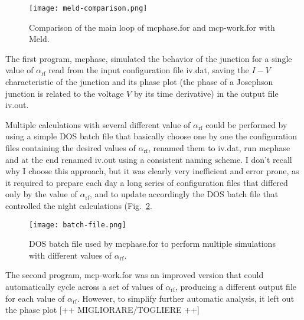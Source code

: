 \begin{figure}[bt]
	\centering
	\texttt{[image: meld-comparison.png]}
	\caption{Comparison of the main loop of \textsf{mcphase.for} and \textsf{mcp-work.for} with Meld.}
	\label{fig:meld-comparison}
\end{figure}


The first program, \textsf{mcphase}, simulated the behavior of the junction for a single value of $\alpha_\mathrm{rf}$ read from the input configuration file \textsf{iv.dat}, saving the $I - V$ characteristic of the junction and its phase plot (the phase of a Josephson junction is related to the voltage $V$ by its time derivative) in the output file \textsf{iv.out}.

Multiple calculations with several different value of $\alpha_\mathrm{rf}$ could be performed by using a simple DOS batch file that basically choose one by one the configuration files containing the desired values of $\alpha_\mathrm{rf}$, renamed them to \textsf{iv.dat}, run \textsf{mcphase} and at the end renamed \textsf{iv.out} using a consistent naming scheme.
I don't recall why I choose this approach, but it was clearly very inefficient and error prone, as it required to prepare each day a long series of configuration files that differed only by the value of $\alpha_\mathrm{rf}$, and to update accordingly the DOS batch file that controlled the night calculations (Fig.~\ref{fig:batch-file}.

\begin{figure}[tbh]
	\centering
	\texttt{[image: batch-file.png]}
	\caption{DOS batch file used by \textsf{mcphase.for} to perform multiple simulations with different values of $\alpha_\mathrm{rf}$.}
	\label{fig:batch-file}
\end{figure}


The second program, \textsf{mcp-work.for} was an improved version that could automatically cycle across a  set of values of $\alpha_\mathrm{rf}$, producing a different output file for each value of $\alpha_\mathrm{rf}$. However, to simplify further automatic analysis, it left out the phase plot [++ MIGLIORARE/TOGLIERE ++]

